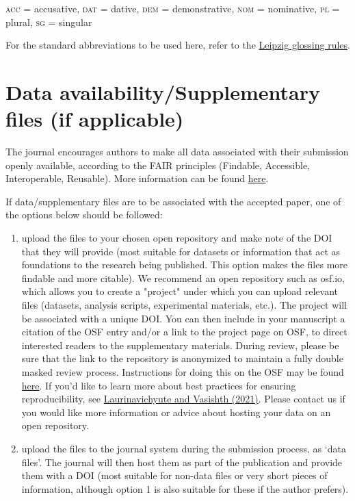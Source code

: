 \documentclass[times,linguex]{glossa}
\begin{document}
\textsc{acc} = accusative, \textsc{dat} = dative, \textsc{dem} = demonstrative, \textsc{nom} = nominative, \textsc{pl} = plural, \textsc{sg} = singular

For the standard abbreviations to be used here, refer to the \href{https://www.eva.mpg.de/lingua/resources/glossing-rules.php}{Leipzig glossing rules}.

\section*{Data availability/Supplementary files (if applicable)}

The journal encourages authors to make all data associated with their submission openly available, according to the FAIR principles (Findable, Accessible, Interoperable, Reusable). More information can be found \href{https://www.glossa-journal.org/site/editorial-policies/#data-policy}{here}.

If data/supplementary files are to be associated with the accepted paper, one of the options below should be followed:
\begin{enumerate}
\item upload the files to your chosen open repository and make note of the DOI that they will provide (most suitable for datasets or information that act as foundations to the research being published. This option makes the files more findable and more citable). We recommend an open repository such as osf.io, which allows you to create a "project" under which you can upload relevant files (datasets, analysis scripts, experimental materials, etc.). The project will be associated with a unique DOI. You can then include in your manuscript a citation of the OSF entry and/or a link to the project page on OSF, to direct interested readers to the supplementary materials. During review, please be sure that the link to the repository is anonymized to maintain a fully double masked review process. Instructions for doing this on the OSF may be found \href{https://help.osf.io/hc/en-us/articles/360019930333-Create-a-View-only-Link-for-a-Project}{here}. If you'd like to learn more about best practices for ensuring reproducibility, see \href{https://psyarxiv.com/hf297/}{Laurinavichyute and Vasishth (2021)}. Please contact us if you would like more information or advice about hosting your data on an open repository.
\item upload the files to the journal system during the submission process, as `data files'. The journal will then host them as part of the publication and provide them with a DOI (most suitable for non-data files or very short pieces of information, although option 1 is also suitable for these if the author prefers).
\end{enumerate}
\end{document}
